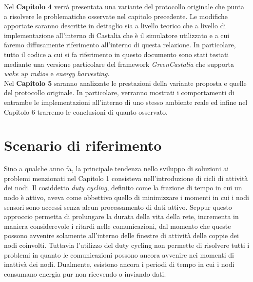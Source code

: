 \documentclass[binding=0.6cm,TFA]{sapthesis}
\begin{document}
Nel \textbf{Capitolo 4} verrà presentata una variante del protocollo originale che punta a risolvere le problematiche osservate nel capitolo precedente. Le
modifiche apportate saranno descritte in dettaglio sia a livello teorico che a livello di implementazione all'interno di Castalia che è
il simulatore utilizzato e a cui faremo diffusamente riferimento all'interno di questa relazione. In particolare, tutto il codice
a cui si fa riferimento in questo documento sono stati testati mediante una versione particolare del framework \emph{GreenCastalia}
che supporta \emph{wake up radios} e \emph{energy harvesting}.\\

Nel \textbf{Capitolo 5} saranno analizzate le prestazioni della variante proposta e quelle del protocollo originale. In particolare, verranno mostrati i
comportamenti di entrambe le implementazioni all'interno di uno stesso ambiente reale ed infine nel Capitolo 6 trarremo le conclusioni di quanto osservato.

\let\cleardoublepage    %
\clearpage
\let\cleardoublepage\clearpage  %

\chapter{Scenario di riferimento}

Sino a qualche anno fa, la principale tendenza nello sviluppo di soluzioni ai problemi menzionati nel Capitolo 1 consisteva nell'introduzione di cicli di attività
dei nodi. Il cosiddetto \emph{duty cycling}, definito come la frazione di tempo in cui un nodo è attivo, aveva come obbettivo quello di minimizzare i momenti
in cui i nodi sensori sono accessi senza alcun processamento di dati attivo. Seppur questo approccio permetta di prolungare la durata della vita della rete,
incrementa in maniera considerevole i ritardi nelle comunicazioni, dal momento che queste possono avvenire solamente all'interno delle finestre di attività
delle coppie dei nodi coinvolti. Tuttavia l'utilizzo del duty cycling non permette di risolvere tutti i problemi in quanto le comunicazioni possono ancora
avvenire nei momenti di inattivà dei nodi. Dualmente, esistono ancora i periodi di tempo in cui i nodi consumano energia pur non ricevendo o inviando dati.\\
\end{document}
